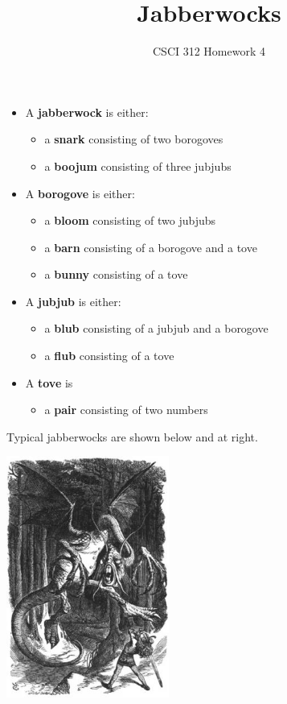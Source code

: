 \documentclass{article}
\author{CSCI 312 Homework 4}
\title{Jabberwocks}
\newcommand{\bi}{\begin{itemize}}
\newcommand{\li}{\item}
\newcommand{\ei}{\end{itemize}}
\begin{document}
\maketitle

\begin{multicols}{2}
\bi
\li A {\bf jabberwock} is either:
\bi
\li a {\bf snark} consisting of two borogoves
\li a {\bf boojum} consisting of three jubjubs
\ei
\li A {\bf borogove} is either:
\bi
\li a {\bf bloom} consisting of two jubjubs
\li a {\bf barn} consisting of a borogove and a tove
\li a {\bf bunny} consisting of a tove
\ei
\li A {\bf jubjub} is either:
\bi
\li a {\bf blub} consisting of a jubjub and a borogove
\li a {\bf flub} consisting of a tove
\ei
\li A {\bf tove} is
\bi 
\li a {\bf pair} consisting of two numbers
\ei
\ei

Typical jabberwocks are shown below and at right.
\newcolumn

\includegraphics[width=0.4\textwidth]{jabberwocky}
\end{multicols}
\begin{center}
\end{center}
\end{document}
